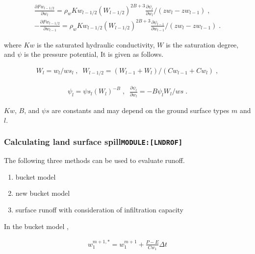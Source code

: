 \begin{eqnarray}
  \frac{\partial Fw_{l-1/2}}{\partial w_l} = \rho_w Kw_{l-1/2} (W_{l-1/2})^{2B+3} 
                     \frac{\partial \psi_{l}}{\partial w_l}/(zw_l - zw_{l-1}) \; ,\\
- \frac{\partial Fw_{l-1/2}}{\partial w_{l-1}} = \rho_w Kw_{l-1/2} (W_{l-1/2})^{2B+3} 
                     \frac{\partial \psi_{l-1}}{\partial w_{l-1}}/(zw_l - zw_{l-1}) \; .
\end{eqnarray}

where \(Kw\) is the saturated hydraulic conductivity, \(W\) is the
saturation degree, and \(\psi\) is the pressure potential, It is given
as follows.

\begin{eqnarray}
  W_l = w_l / ws_l \; , \;\;
  W_{l-1/2} = (W_{l-1} + W_{l})/(Cw_{l-1} + Cw_{l}) \; ,
\end{eqnarray}

\begin{eqnarray}
  \psi_l = \psi s_l (W_l)^{-B}\; , \;\;
  \frac{\partial \psi_l}{\partial w_l} = -B \psi_l W_l / ws \; .
\end{eqnarray}

\(Kw\), \(B\), and \(\psi s\) are constants and may depend on the ground
surface types \(m\) and \(l\).

\hypertarget{calculating-land-surface-spillmodulelndrof}{%
\subsubsection{\texorpdfstring{Calculating land surface
spill\texttt{MODULE:{[}LNDROF{]}}}{Calculating land surface spillMODULE:{[}LNDROF{]}}}\label{calculating-land-surface-spillmodulelndrof}}

The following three methods can be used to evaluate runoff.

\begin{enumerate}
\def\labelenumi{\arabic{enumi}.}
\item
  bucket model
\item
  new bucket model
\item
  surface runoff with consideration of infiltration capacity
\end{enumerate}

In the bucket model ,

\begin{eqnarray}
w_1^{m+1,*} = w_1^{m+1} +  \frac{P - E}{Cw_1} \Delta t
\end{eqnarray}

